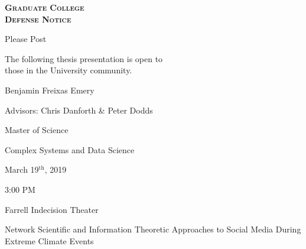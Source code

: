 \documentclass[14pt]{article}
\begin{document}
\begin{center}
\begin{large}
\vspace*{0.3cm}
\textbf{\textsc{Graduate College}}\\
\textbf{\textsc{Defense Notice}}\\[.5\baselineskip]
\end{large}
Please Post

The following thesis presentation is open to\\
those in the University community.

Benjamin Freixas Emery

Advisors: Chris Danforth \& Peter Dodds
 
Master of Science

Complex Systems and Data Science

March 19$^{\text{th}}$, 2019

3:00 PM

Farrell Indecision Theater

Network Scientific and Information Theoretic Approaches to Social Media During Extreme Climate Events
\end{center}
\end{document}
